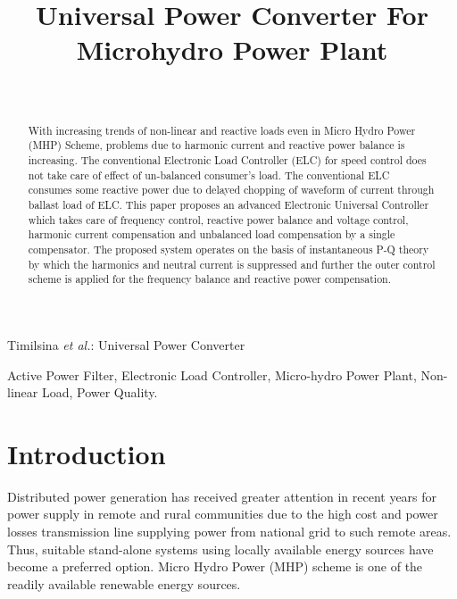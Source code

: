 \documentclass[journal,twoside]{IEEEtran}
\begin{document}
    \setcounter{page}{47}
    \title{Universal Power Converter For
Microhydro Power Plant}
    \author{\\
    }

%
{Timilsina \MakeLowercase{\textit{et al.}}: Universal Power Converter}
    \maketitle
	\begin{abstract}
With increasing trends of non-linear and reactive
loads even in Micro Hydro Power (MHP) Scheme, problems due
to harmonic current and reactive power balance is increasing.
The conventional Electronic Load Controller (ELC) for speed
control does not take care of effect of un-balanced consumer’s
load. The conventional ELC consumes some reactive power due
to delayed chopping of waveform of current through ballast load
of ELC. This paper proposes an advanced Electronic Universal
Controller which takes care of frequency control, reactive power
balance and voltage control, harmonic current compensation and
unbalanced load compensation by a single compensator. The
proposed system operates on the basis of instantaneous P-Q
theory by which the harmonics and neutral current is suppressed
and further the outer control scheme is applied for the frequency
balance and reactive power compensation.
	\end{abstract}
	\begin{IEEEkeywords}
Active Power Filter, Electronic Load Controller, Micro-hydro Power Plant, Non-linear Load, 
Power Quality.
	\end{IEEEkeywords}
	\section{Introduction}
Distributed power generation has received greater attention
in recent years for power supply in remote and rural
communities due to the high cost and power losses
transmission line supplying power from national grid to such
remote areas. Thus, suitable stand-alone systems using locally
available energy sources have become a preferred option.
Micro Hydro Power (MHP) scheme is one of the readily
available renewable energy sources\cite{1}.
\end{document}
